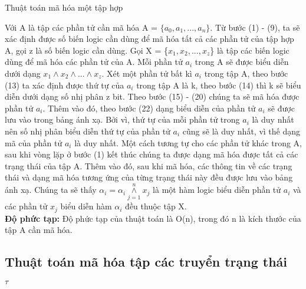 \documentclass[a4paper,13pt,oneside,openany]{book}
\newenvironment{megaalgorithm}[1][htb]
{\renewcommand{\algorithmcfname}{Thuật toán}%
	\begin{algorithm}[#1]%
}{\end{algorithm}}
\begin{document}
\begin{flushleft}
\begin{megaalgorithm}[H]
			\caption{Thuật toán mã hóa một tập hợp}
		\end{megaalgorithm}
		Với A là tập các phần tử cần mã hóa A = $\{a_0, a_1, ..., a_n\}$. Từ bước (1) - (9), ta sẽ xác định được số biến logic cần dùng để mã hóa tất cả các phần tử của tập hợp A, gọi z là số biến logic cần dùng. Gọi X = \{$x_{1}, x_{2}, ..., x_{z}$\} là tập các biến logic dùng để mã hóa các phần tử của A. Mỗi phần tử $a_i$ trong A sẽ được biểu diễn dưới dạng $x_{1}\land x_{2}\land...\land x_{z}$. Xét một phần tử bất kì $a_i$ trong tập A, theo bước (13) ta xác định được thứ tự của $a_i$ trong tập A là k, theo bước (14) thì k sẽ biểu diễn dưới dạng số nhị phân z bit. Theo bước (15) - (20) chúng ta sẽ mã hóa được phần tử $a_i$. Thêm vào đó, theo bước (22) dạng biểu diễn của phần tử $a_i$ sẽ được lưu vào trong bảng ánh xạ. Bởi vì, thứ tự của mỗi phần tử trong $a_i$ là duy nhất nên số nhị phân biểu diễn thứ tự của phần tử $a_i$ cũng sẽ là duy nhất, vì thế dạng mã của phần tử $a_i$ là duy nhất. Một cách tương tự cho các phần tử khác trong A, sau khi vòng lặp ở bước (1) kết thúc chúng ta được dạng mã hóa được tất cả các trạng thái của tập A. Thêm vào đó, sau khi mã hóa, các thông tin về các trạng thái và dạng mã hóa tương ứng của từng trạng thái này đều được lưu vào bảng ánh xạ.
		Chúng ta sẽ thấy $\alpha_i = \alpha_i \overset{n}{\underset{j=1}{\land}} x_j$ là một hàm logic biểu diễn phần tử $a_i$ và các phần tử $x_j$ biểu diễn hàm $\alpha_i$ đều thuộc tập X.\\
		\textbf{Độ phức tạp:} Độ phức tạp của thuật toán là O(n), trong đó n là kích thước của tập A cần mã hóa.\\	
				
		\subsection{Thuật toán mã hóa tập các truyển trạng thái}
		\begin{megaalgorithm}[H]
			\SetAlgoLined
			\DontPrintSemicolon
				
			\Return $\tau$
				

\end{megaalgorithm}
\end{flushleft}
\end{document}
